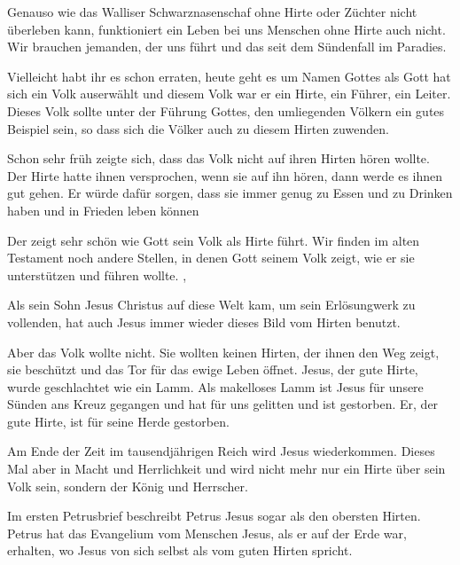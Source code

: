 \begin{otsblock}[Einführung]
    Genauso wie das Walliser Schwarznasenschaf ohne Hirte oder Züchter nicht überleben kann, funktioniert ein Leben bei uns Menschen ohne Hirte auch nicht. Wir brauchen jemanden, der uns führt und das seit dem Sündenfall im Paradies.

    \begin{otsblock}
        Vielleicht habt ihr es schon erraten, heute geht es um Namen Gottes als  Gott hat sich ein Volk auserwählt und diesem Volk war er ein Hirte, ein Führer, ein Leiter. Dieses Volk sollte unter der Führung Gottes, den umliegenden Völkern ein gutes Beispiel sein, so dass sich die Völker auch zu diesem Hirten zuwenden.

        Schon sehr früh zeigte sich, dass das Volk nicht auf ihren Hirten hören wollte. Der Hirte hatte ihnen versprochen, wenn sie auf ihn hören, dann werde es ihnen gut gehen. Er würde dafür sorgen, dass sie immer genug zu Essen und zu Drinken haben und in Frieden leben können

        Der  zeigt sehr schön wie Gott sein Volk als Hirte führt. Wir finden im alten Testament noch andere Stellen, in denen Gott seinem Volk zeigt, wie er sie unterstützen und führen wollte.
        , 

        Als sein Sohn Jesus Christus auf diese Welt kam, um sein Erlösungwerk zu vollenden, hat auch Jesus immer wieder dieses Bild vom Hirten benutzt.

        Aber das Volk wollte nicht. Sie wollten keinen Hirten, der ihnen den Weg zeigt, sie beschützt und das Tor für das ewige Leben öffnet.  Jesus, der gute Hirte, wurde geschlachtet wie ein Lamm. Als makelloses Lamm ist Jesus für unsere Sünden ans Kreuz gegangen und hat für uns gelitten und ist gestorben. Er, der gute Hirte, ist für seine Herde gestorben. 

        Am Ende der Zeit im tausendjährigen Reich wird Jesus wiederkommen. Dieses Mal aber in Macht und Herrlichkeit und wird nicht mehr nur ein Hirte über sein Volk sein, sondern der König und Herrscher.

        Im ersten Petrusbrief \zB{}  beschreibt Petrus Jesus sogar als den obersten Hirten. 
        Petrus hat das Evangelium vom Menschen Jesus, als er auf der Erde war, erhalten, wo Jesus von sich selbst als vom guten Hirten spricht. 


\end{otsblock}
\end{otsblock}
